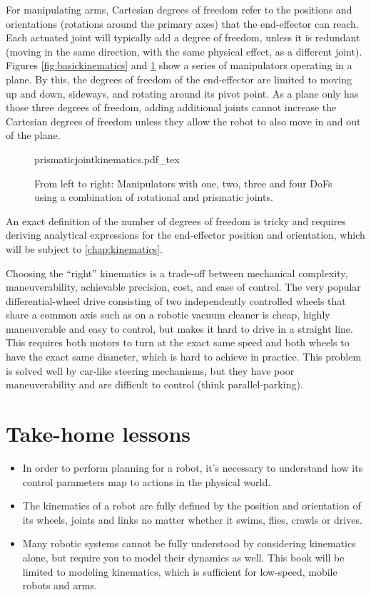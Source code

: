 For manipulating arms, Cartesian degrees of freedom refer to the positions and orientations (rotations around the primary axes) that the end-effector can reach. Each actuated joint will typically add a degree of freedom, unless it is redundant (moving in the same direction, with the same physical effect, as a different joint). Figures \ref{fig:basickinematics} and \ref{fig:prismaticjointkinematics} show a series of manipulators operating in a plane. By this, the degrees of freedom of the end-effector are limited to moving up and down, sideways, and rotating around its pivot point. As a plane only has those three degrees of freedom, adding additional joints cannot increase the Cartesian degrees of freedom unless they allow the robot to also move in and out of the plane.

\begin{figure}[!htb]
    \centering
    \def\svgwidth{\textwidth}
    {prismaticjointkinematics.pdf_tex}
    \caption{From left to right: Manipulators with one, two, three and four DoFs using a combination of rotational and prismatic joints.}
    \label{fig:prismaticjointkinematics}
\end{figure}

An exact definition of the number of degrees of freedom is tricky and requires deriving analytical expressions for the end-effector position and orientation, which will be subject to \cref{chap:kinematics}.


Choosing the ``right'' kinematics is a trade-off between mechanical complexity, maneuverability, achievable precision, cost, and ease of control. The very popular differential-wheel drive consisting of two independently controlled wheels that share a common axis such as on a robotic vacuum cleaner is cheap, highly maneuverable and easy to control, but makes it hard to drive in a straight line. This requires both motors to turn at the exact same speed and both wheels to have the exact same diameter, which is hard to achieve in practice. This problem is solved well by car-like steering mechanisms, but they have poor maneuverability and are difficult to control (think parallel-parking).


\section*{Take-home lessons}

\begin{itemize}
\item In order to perform planning for a robot, it's necessary to understand how its control parameters map to actions in the physical world.
\item The kinematics of a robot are fully defined by the position and orientation of its wheels, joints and links no matter whether it swims, flies, crawls or drives.
\item Many robotic systems cannot be fully understood by considering kinematics alone, but require you to model their dynamics as well. This book will be limited to modeling kinematics, which is sufficient for low-speed, mobile robots and arms.
\end{itemize}


